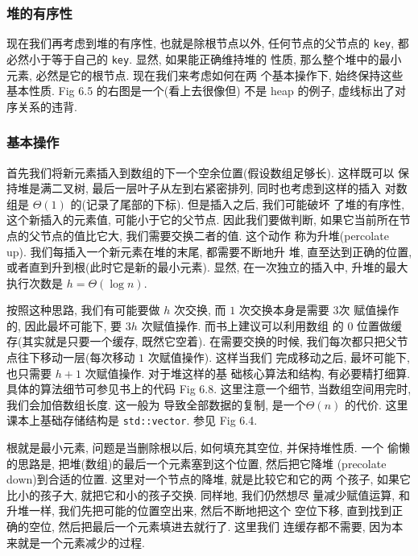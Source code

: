 \documentclass[a4paper]{ctexart}
\theoremstyle{definition}
\theoremstyle{definition}
\begin{document}
\subsubsection{堆的有序性}

现在我们再考虑到堆的有序性, 也就是除根节点以外, 任何节点的父节点的
\verb|key|, 都必然小于等于自己的 \verb|key|. 显然, 如果能正确维持堆的
性质, 那么整个堆中的最小元素, 必然是它的根节点. 现在我们来考虑如何在两
个基本操作下, 始终保持这些基本性质. Fig 6.5 的右图是一个(看上去很像但)
不是 heap 的例子, 虚线标出了对序关系的违背.


\subsubsection{基本操作}
首先我们将新元素插入到数组的下一个空余位置(假设数组足够长). 这样既可以
保持堆是满二叉树, 最后一层叶子从左到右紧密排列, 同时也考虑到这样的插入
对数组是 $\Theta(1)$ 的(记录了尾部的下标). 但是插入之后, 我们可能破坏
了堆的有序性, 这个新插入的元素值, 可能小于它的父节点. 因此我们要做判断,
如果它当前所在节点的父节点的值比它大, 我们需要交换二者的值.  这个动作
称为升堆(percolate up). 我们每插入一个新元素在堆的末尾, 都需要不断地升
堆, 直至达到正确的位置, 或者直到升到根(此时它是新的最小元素).  显然,
在一次独立的插入中, 升堆的最大执行次数是 $h = \Theta(\log n)$.

按照这种思路, 我们有可能要做 $h$ 次交换, 而 $1$ 次交换本身是需要 $3$次
赋值操作的, 因此最坏可能下, 要 $3h$ 次赋值操作. 而书上建议可以利用数组
的 $0$ 位置做缓存(其实就是只要一个缓存, 既然它空着). 在需要交换的时候,
我们每次都只把父节点往下移动一层(每次移动 $1$ 次赋值操作). 这样当我们
完成移动之后, 最坏可能下, 也只需要 $h + 1$ 次赋值操作. 对于堆这样的基
础核心算法和结构, 有必要精打细算. 具体的算法细节可参见书上的代码 Fig
6.8. 这里注意一个细节, 当数组空间用完时, 我们会加倍数组长度. 这一般为
导致全部数据的复制, 是一个$\Theta(n)$ 的代价. 这里课本上基础存储结构是
\verb|std::vector|. 参见 Fig 6.4.


根就是最小元素, 问题是当删除根以后, 如何填充其空位, 并保持堆性质. 一个
偷懒的思路是, 把堆(数组)的最后一个元素塞到这个位置, 然后把它降堆
(precolate down)到合适的位置. 这里对一个节点的降堆, 就是比较它和它的两
个孩子, 如果它比小的孩子大, 就把它和小的孩子交换. 同样地, 我们仍然想尽
量减少赋值运算, 和升堆一样, 我们先把可能的位置空出来, 然后不断地把这个
空位下移, 直到找到正确的空位, 然后把最后一个元素填进去就行了. 这里我们
连缓存都不需要, 因为本来就是一个元素减少的过程.
\end{document}
